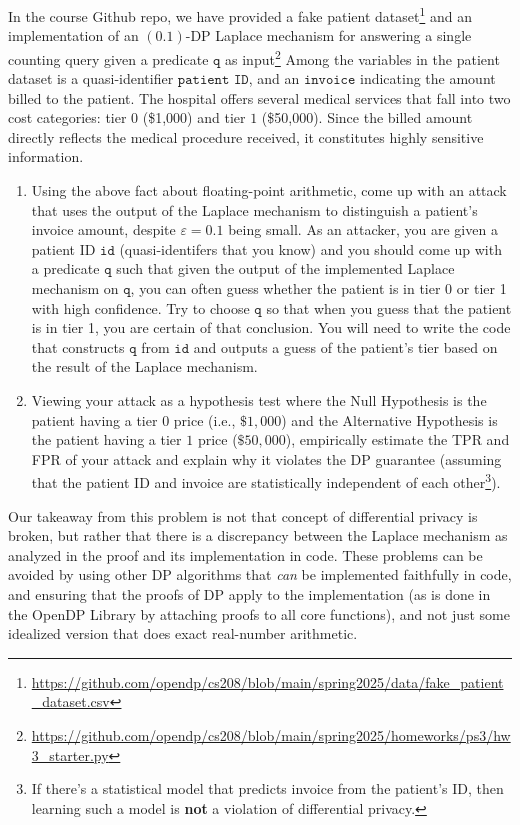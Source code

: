 \documentclass[11pt]{article}
\begin{document}
\begin{enumerate}[leftmargin=*]
In the course Github repo, we have provided a fake patient dataset\footnote{\url{https://github.com/opendp/cs208/blob/main/spring2025/data/fake_patient_dataset.csv}} 
and an implementation of an $(0.1)$-DP Laplace mechanism for answering a single counting query given a predicate $\texttt{q}$ as input\footnote{\url{https://github.com/opendp/cs208/blob/main/spring2025/homeworks/ps3/hw3_starter.py}}
Among the variables in the patient dataset is a quasi-identifier $\texttt{patient ID}$, and an $\texttt{invoice}$ indicating the amount billed to the patient. The hospital offers several medical services that fall into two cost categories: tier $0$ (\$1,000) and tier $1$ (\$50,000). 
Since the billed amount directly reflects the medical procedure received, it constitutes highly sensitive information.

\begin{enumerate}
    \item 
    Using the above fact about floating-point arithmetic, come up with an attack 
    that uses the output of the Laplace mechanism to distinguish a patient's invoice amount, despite $\varepsilon=0.1$ being small.
    As an attacker, you are given a patient ID $\texttt{id}$ (quasi-identifers that you know) and you should come up with a predicate $\texttt{q}$ such that given the output of the implemented Laplace mechanism on $\texttt{q}$, you can often guess whether the patient is in tier 0 or tier 1 with high confidence.  Try to choose $\texttt{q}$ so that when you guess that the patient is in tier 1, you are certain of that conclusion.  You will need to write the code that constructs $\texttt{q}$ from $\texttt{id}$ and outputs a guess of the patient's tier based on the result of the Laplace mechanism. 
    
    \item Viewing your attack as a hypothesis test where the Null Hypothesis is the patient having a tier $0$ price (i.e., $\$1,000$) and the Alternative Hypothesis is the patient having a tier $1$ price ($\$50,000$),  
    empirically estimate the TPR and FPR of your attack and explain why it violates the DP guarantee (assuming that the patient ID and invoice are statistically independent of each other\footnote{If there's a statistical model that predicts invoice from the patient's ID, then learning such a model is \textbf{not} a violation of differential privacy.}).
\end{enumerate}
Our takeaway from this problem is not that concept of differential privacy is broken, but rather that there is a discrepancy between the Laplace mechanism as analyzed in the proof and its implementation in code. These problems can be avoided by using other DP algorithms that {\em can} be implemented faithfully in code, and ensuring that the proofs of DP apply to the implementation (as is done in the OpenDP Library by attaching proofs to all core functions), and not just some idealized version that does exact real-number arithmetic.


\end{enumerate}
\end{document}
